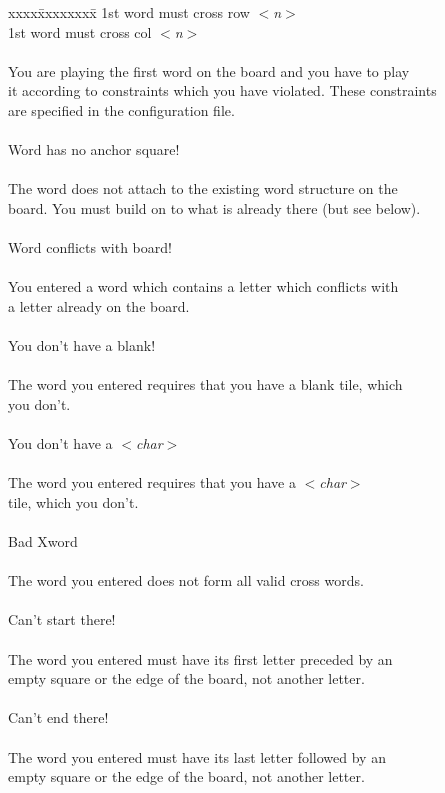 \begin{tabbing}
xxxx\=xxxxxxxx\=\+\kill
1st word must cross row $<${\em n}$>$\\
1st word must cross col $<${\em n}$>$\\
\mbox{}\\
\>You are playing the first word on the board and you have to play\\
\>it according to constraints which you have violated. These constraints\\
\>are specified in the configuration file.\\
\mbox{}\\
Word has no anchor square!\\
\mbox{}\\
\>The word does not attach to the existing word structure on the\\
\>board. You must build on to what is already there (but see below).\\
\mbox{}\\ 
Word conflicts with board!\\
\mbox{}\\
\>You entered a word which contains a letter which conflicts with\\
\>a letter already on the board.\\
\mbox{}\\
You don't have a blank!\\
\mbox{}\\
\>The word you entered requires that you have a blank tile, which\\
\>you don't.\\
\mbox{}\\
You don't have a $<${\em char}$>$\\
\mbox{}\\
\>The word you entered requires that you have a $<${\em char}$>$ \\
\>tile, which you don't.\\
\mbox{}\\	
Bad Xword\\
\mbox{}\\
\>The word you entered does not form all valid cross words.\\
\mbox{}\\
Can't start there!\\
\mbox{}\\
\>The word you entered must have its first letter preceded by an\\
\>empty square or the edge of the board, not another letter.\\
\mbox{}\\
Can't end there!\\
\mbox{}\\
\>The word you entered must have its last letter followed by an\\
\>empty square or the edge of the board, not another letter.\\
\end{tabbing}

